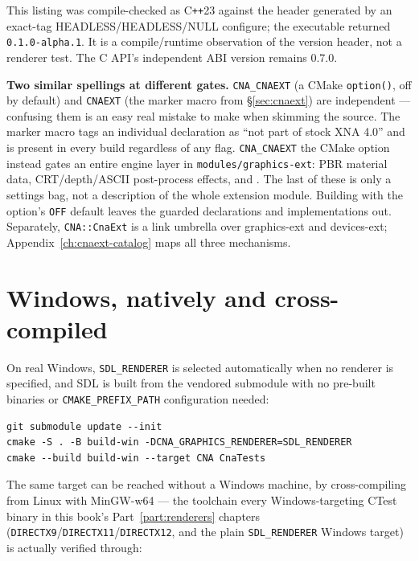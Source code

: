 This listing was compile-checked as C\texttt{++}23 against the header generated by an exact-tag
HEADLESS/HEADLESS/NULL configure; the executable returned \texttt{0.1.0-alpha.1}. It is a
compile/runtime observation of the version header, not a renderer test. The C API's independent
ABI version remains 0.7.0.

\begin{sourcenote}
\textbf{Two similar spellings at different gates.} \texttt{CNA\_CNAEXT} (a CMake
\texttt{option()}, off by default) and \texttt{CNAEXT} (the marker macro from
\S\ref{sec:cnaext}) are independent --- confusing them is an easy real mistake to make when
skimming the source. The
marker macro tags an individual declaration as ``not part of stock XNA 4.0'' and is present in
every build regardless of any flag. \texttt{CNA\_CNAEXT} the CMake option instead gates an
entire  engine layer in \texttt{modules/graphics-ext}: PBR material data,
CRT/depth/ASCII post-process effects, and .  The last of these is
only a settings bag, not a description of the whole extension module.  Building with the option's
\texttt{OFF} default leaves the guarded declarations and implementations out.  Separately,
\texttt{CNA::CnaExt} is a link umbrella over graphics-ext and devices-ext; Appendix~\ref{ch:cnaext-catalog}
maps all three mechanisms.
\end{sourcenote}

\section{Windows, natively and cross-compiled}

On real Windows, \texttt{SDL\_RENDERER} is selected automatically when no renderer is
specified, and SDL is built from the vendored submodule with no pre-built binaries or
\texttt{CMAKE\_PREFIX\_PATH} configuration needed:

\begin{lstlisting}[style=cnashell]
git submodule update --init
cmake -S . -B build-win -DCNA_GRAPHICS_RENDERER=SDL_RENDERER
cmake --build build-win --target CNA CnaTests
\end{lstlisting}

The same target can be reached without a Windows machine, by cross-compiling from Linux with
MinGW-w64 --- the toolchain every Windows-targeting CTest binary in this book's
Part~\ref{part:renderers}
chapters (\texttt{DIRECTX9}/\texttt{DIRECTX11}/\texttt{DIRECTX12}, and the plain
\texttt{SDL\_RENDERER} Windows target) is actually
verified through:

